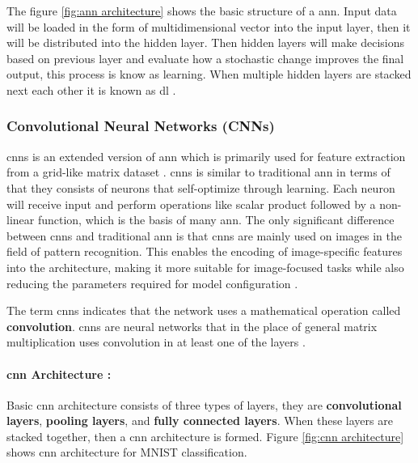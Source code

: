 The figure \ref{fig:ann architecture} shows the basic structure of a \gls{ann}. Input data will be loaded in the form of multidimensional vector into the input layer, then it will be distributed into the hidden layer. Then hidden layers will make decisions based on previous layer and evaluate how a stochastic change improves the final output, this process is know as learning. When multiple hidden layers are stacked next each other it is known as \gls{dl} \cite{oshea2015introductionconvolutionalneuralnetworks}.

\subsubsection{Convolutional Neural Networks (CNNs)}

\glspl{cnn}\cite{726791} is an extended version of \gls{ann} which is primarily used for feature extraction from a grid-like matrix dataset \cite{GeeksforGeeks2024}. \glspl{cnn} is similar to traditional \gls{ann} in terms of that they consists of neurons that self-optimize through learning. Each neuron will receive input and perform operations like scalar product followed by a non-linear function, which is the basis of many \gls{ann}. The only significant difference between \glspl{cnn} and traditional \gls{ann} is that \glspl{cnn} are mainly used on images in the field of pattern recognition. This enables the encoding of image-specific features into the architecture, making it more suitable for image-focused tasks while also reducing the parameters required for model configuration \cite{oshea2015introductionconvolutionalneuralnetworks}.

The term \glspl{cnn} indicates that the network uses a mathematical operation called \textbf{convolution}. \glspl{cnn} are neural networks that in the place of general matrix multiplication uses convolution in at least one of the layers \cite{Goodfellow-et-al-2016}.

\paragraph*{\gls{cnn} Architecture :}

Basic \gls{cnn} architecture consists of three types of layers, they are \textbf{convolutional layers}, \textbf{pooling layers}, and \textbf{fully connected layers}. When these layers are stacked together, then a \gls{cnn} architecture is formed. Figure \ref{fig:cnn architecture} shows \gls{cnn} architecture for MNIST\cite{6296535} classification.


